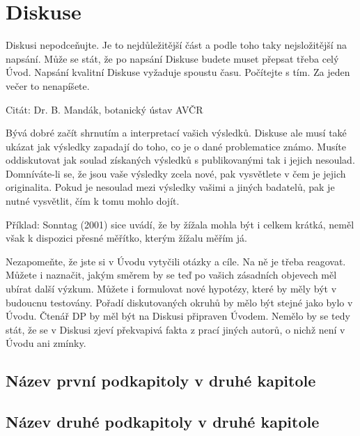 \chapter{Diskuse}

Diskusi nepodceňujte. Je to nejdůležitější část a podle toho taky nejsložitější na napsání. Může se stát, že po napsání Diskuse budete muset přepsat třeba celý Úvod. Napsání kvalitní Diskuse vyžaduje spoustu času. Počítejte s tím. Za jeden večer to nenapíšete.

Citát:  Dr. B. Mandák, botanický ústav AVČR

Bývá dobré začít shrnutím a interpretací vašich výsledků. Diskuse ale musí také ukázat jak výsledky zapadají do toho, co je o dané problematice známo. Musíte oddiskutovat jak soulad získaných výsledků s publikovanými tak i jejich nesoulad. Domníváte-li se, že jsou vaše výsledky zcela nové, pak vysvětlete v čem je jejich originalita. Pokud je nesoulad mezi výsledky vašimi a jiných badatelů, pak je nutné vysvětlit, čím k tomu mohlo dojít.

Příklad: Sonntag (2001) sice uvádí, že by žížala mohla být i celkem krátká, neměl však k dispozici přesné měřítko, kterým žížalu měřím já.

Nezapomeňte, že jste si v Úvodu vytyčili otázky a cíle. Na ně je třeba reagovat. Můžete i naznačit, jakým směrem by se teď po vašich zásadních objevech měl ubírat další výzkum. Můžete i formulovat nové hypotézy, které by měly být v budoucnu testovány. Pořadí diskutovaných okruhů by mělo být stejné jako bylo v Úvodu. Čtenář DP by měl být na Diskusi připraven Úvodem. Nemělo by se tedy stát, že se v Diskusi zjeví překvapivá fakta z prací jiných autorů, o nichž není v Úvodu ani zmínky. 

\section{Název první podkapitoly v druhé kapitole}

\section{Název druhé podkapitoly v druhé kapitole}

